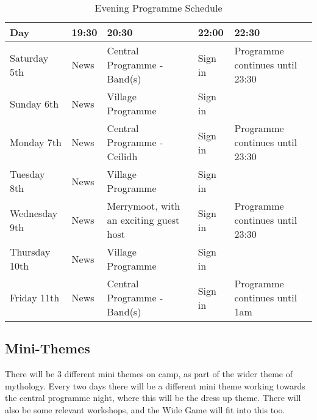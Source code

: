 \documentclass[a4paper, 11pt]{report}
\begin{document}
\begin{table}[H]
    \centering
    {\RaggedRight
    \begin{tabular}{p{} p{} p{} p{} p{}}
    \textbf{Day} & \textbf{19:30} & \textbf{20:30} & \textbf{22:00} & \textbf{22:30} \\
    \hline
    Saturday 5th & News & Central Programme  - Band(s) & Sign in & Programme continues until 23:30 \\
    \hline
    Sunday 6th & News & Village Programme & Sign in &  \\
    \hline
    Monday 7th & News & Central Programme - Ceilidh & Sign in & Programme continues until 23:30 \\
    \hline
    Tuesday 8th & News & Village Programme & Sign in &  \\
    \hline
    Wednesday 9th & News & Merrymoot, with an exciting guest host & Sign in & Programme continues until 23:30 \\
    \hline
    Thursday 10th & News & Village Programme & Sign in &  \\
    \hline
    Friday 11th & News & Central Programme - Band(s) & Sign in & Programme continues until 1am\\
    \hline
    \end{tabular}
    }%
    \caption{Evening Programme Schedule}
\end{table}

\subsection{Mini-Themes}
There will be 3 different mini themes on camp, as part of the wider theme of mythology. Every two days there will be a different mini theme working towards the central programme night, where this will be the dress up theme. There will also be some relevant workshops, and the Wide Game will fit into this too.
\end{document}
